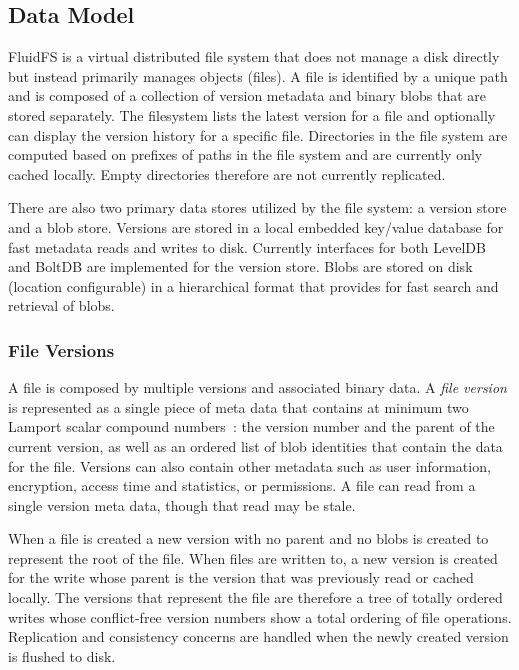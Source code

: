 \documentclass[letterpaper,twocolumn,10pt]{article}
\begin{document}
\subsection*{Data Model}

FluidFS is a virtual distributed file system that does not manage a disk
directly but instead primarily manages objects (files).
A file is identified by a unique path and is composed of a collection of
version metadata and binary blobs that are stored separately.
The filesystem lists the latest version for a file and optionally can display
the version history for a specific file.
Directories in the file system are computed based on prefixes of paths in the
file system and are currently only cached locally.
Empty directories therefore are not currently replicated.

There are also two primary data stores utilized by the file system: a version
store and a blob store.
Versions are stored in a local embedded key/value database for fast metadata
reads and writes to disk.
Currently interfaces for both LevelDB and BoltDB are implemented for the
version store.
Blobs are stored on disk (location configurable) in a hierarchical format
that provides for fast search and retrieval of blobs.

\subsubsection*{File Versions}

A file is composed by multiple versions and associated binary data.
A \textit{file version} is represented as a single piece of meta
data that contains at minimum two Lamport scalar compound
numbers~\cite{lamport_time_1978}: the
version number and the parent of the current version, as well as an ordered
list of blob identities that contain the data for the file.
Versions can also contain other metadata such as user information,
encryption, access time and statistics, or permissions.
A file can read from a single version meta data, though that read may be
stale.

When a file is created a new version with no parent and no blobs is created
to represent the root of the file.
When files are written to, a new version is created for the write whose
parent is the version that was previously read or cached locally.
The versions that represent the file are therefore a tree of totally ordered
writes whose conflict-free version numbers show a total ordering of file
operations.
Replication and consistency concerns are handled when the newly created
version is flushed to disk.
\end{document}
